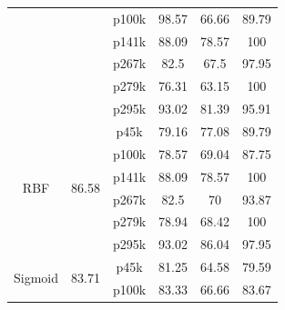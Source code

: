 \begin{table}[h]
{\begin{tabular}{cccccc}
                            &                                                 & p100k                    & 98.57            & 66.66         & 89.79                      \\
                            &                                                 & p141k                    & 88.09            & 78.57         & 100                        \\
                            &                                                 & p267k                    & 82.5             & 67.5          & 97.95                      \\
                            &                                                 & p279k                    & 76.31            & 63.15         & 100                        \\
                            &                                                 & p295k                    & 93.02            & 81.39         & 95.91                      \\
\hline
\multirow{6}{*}{RBF}        & \multirow{6}{*}{86.58}                          & p45k                     & 79.16            & 77.08         & 89.79                      \\
                            &                                                 & p100k                    & 78.57            & 69.04         & 87.75                      \\
                            &                                                 & p141k                    & 88.09            & 78.57         & 100                        \\
                            &                                                 & p267k                    & 82.5             & 70            & 93.87                      \\
                            &                                                 & p279k                    & 78.94            & 68.42         & 100                        \\
                            &                                                 & p295k                    & 93.02            & 86.04         & 97.95                      \\
\hline
\multirow{6}{*}{Sigmoid}    & \multirow{6}{*}{83.71}                          & p45k                     & 81.25            & 64.58         & 79.59                      \\
                            &                                                 & p100k                    & 83.33            & 66.66         & 83.67                      \\

\end{tabular}}
\end{table}

